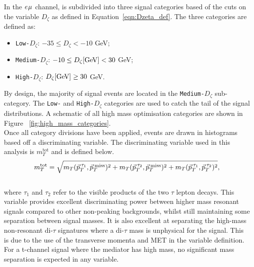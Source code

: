 In the $e_{}\mu_{}$ channel, is subdivided into three signal categories based of the cuts on the variable $D_{\zeta}$ as defined in Equation~\ref{eqn:Dzeta_def}.
The three categories are defined as:
\begin{itemize}
\item \texttt{Low-$D_\zeta$}: $-35 \leq D_\zeta < -10$ GeV;
\item \texttt{Medium-$D_\zeta$}: $-10 \leq D_\zeta [\text{GeV}] <  30$ GeV;
\item \texttt{High-$D_\zeta$}: $D_\zeta [\text{GeV}] \geq 30$ GeV.
\end{itemize}
By design, the majority of signal events are located in the \texttt{Medium-$D_\zeta$} sub-category.
The \texttt{Low-} and \texttt{High-$D_\zeta$} categories are used to catch the tail of the signal distributions.
A schematic of all high mass optimisation categories are shown in Figure ~\ref{fig:high_mass_categories}. \\

Once all category divisions have been applied, events are drawn in histograms based off a discriminating variable.
The discriminating variable used in this analysis is $m_{T}^{\text{tot}}$ and is defined below. \\
\begin{equation}
m_{T}^\text{tot} = \sqrt{m_{T}(\vec{p}_{T}^{\hspace{2pt}\tau_1},\vec{p}_{T}^{\hspace{2pt}\text{miss}})^2 +  m_{T}(\vec{p}_{T}^{\hspace{2pt}\tau_2},\vec{p}_{T}^{\hspace{2pt}\text{miss}})^2 + m_{T}(\vec{p}_{T}^{\hspace{2pt}\tau_1},\vec{p}_{T}^{\hspace{2pt}\tau_2})^2},
\label{eqn:mt_tot}
\end{equation} \\
where $\tau_1$ and $\tau_2$ refer to the visible products of the two $\tau$ lepton decays.
This variable provides excellent discriminating power between higher mass resonant signals compared to other non-peaking backgrounds, whilst still maintaining some separation between signal masses.
It is also excellent at separating the high-mass non-resonant di-$\tau$ signatures where a di-$\tau$ mass is unphysical for the signal.
This is due to the use of the transverse momenta and MET in the variable definition.
For a t-channel signal where the mediator has high mass, no significant mass separation is expected in any variable. \\


